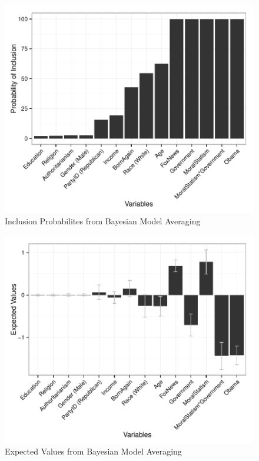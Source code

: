 \documentclass[12pt,]{article}
\begin{document}
\clearpage

\begin{figure}[htbp]
\centering
\includegraphics{figures/bma2-1.pdf}
\caption{Inclusion Probabilites from Bayesian Model Averaging}
\end{figure}

\clearpage

\begin{figure}[htbp]
\centering
\includegraphics{figures/bma3-1.pdf}
\caption{Expected Values from Bayesian Model Averaging}
\end{figure}
\end{document}
